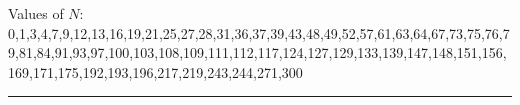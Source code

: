 \documentclass[6pt]{scrartcl}
\begin{document}
\begin{multicols}{4}
\begin{comment}
\begin{equation*}
\frac1n\sum_{i=1}^l(|P_i|\frac1{|P_i|}) = \frac ln
\end{equation*}
\end{comment}

\begin{comment}
\begin{center}
This cheat-sheet is an update by \emph{F. Youssef} of the amazing work of \emph{A. Cholleton}, \emph{J. Perrochet}, \emph{C. Chiche} and \emph{T. Schlatter}. GitHub: \url{https://github.com/franckysnow/mobnet2014}
\end{center}
\end{comment}

\end{multicols}

\begin{center}
\vspace{-10pt}
Values of $N$: 0,1,3,4,7,9,12,13,16,19,21,25,27,28,31,36,37,39,43,48,49,52,57,61,63,64,67,73,75,76,79,81,84,91,93,97,100,103,108,109,111,112,117,124,127,129,133,139,147,148,151,156,169,171,175,192,193,196,217,219,243,244,271,300
\end{center}
\vspace{-5pt}

\hrule
\vspace{-10pt}

\end{document}

